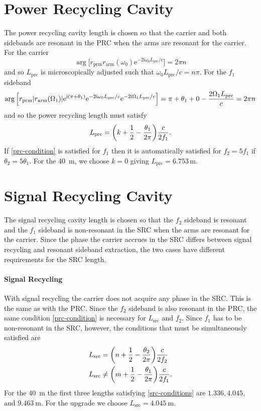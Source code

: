\documentclass[12pt]{article}
\newcommand{\mr}[1]{\mathrm{#1}}
\newcommand{\e}{\mr{e}}
\renewcommand{\i}{\mr{i}}
\newcommand{\abs}[1]{\left|#1\right|}
\let\originalleft\left
\let\originalright\right
\renewcommand{\left}{\mathopen{}\mathclose\bgroup\originalleft}
\renewcommand{\right}{\aftergroup\egroup\originalright}
\begin{document}
\section{Power Recycling Cavity}

The power recycling cavity length is chosen so that the carrier and both sidebands are resonant in the PRC when the arms are resonant for the carrier. For the carrier
\begin{equation}
\arg \Big[ r_\mr{prm} r_\mr{arm}(\omega_0) \e^{-2\i\omega_0 L_\mr{prc}/c} \Big] = 2\pi n
\end{equation}
and so $L_\mr{prc}$ is microscopically adjusted such that $\omega_0 L_\mr{prc} / c = n\pi$. For the $f_1$ sideband
\begin{equation}
\arg \Big[r_\mr{prm} \abs{r_\mr{arm}(\Omega_1)}\e^{\i(\pi + \theta_1)} \e^{-2\i\omega_0 L_\mr{prc}/c}
\e^{-2\i\Omega_1 L_\mr{prc}/c} \Big]
= \pi + \theta_1 + 0 - \frac{2\Omega_1 L_\mr{prc}}{c}
= 2\pi n
\end{equation}
and so the power recycling length must satisfy
\begin{equation}
L_\mr{prc} = \left(k + \frac{1}{2} - \frac{\theta_1}{2\pi} \right) \frac{c}{2f_1}.
\label{prc-condition}
\end{equation}
If \eqref{prc-condition} is satisfied for $f_1$ then it is automatically satisfied for $f_2 = 5f_1$ if $\theta_2 = 5\theta_1$. For the 40~m, we choose $k=0$ giving $L_\mr{prc} = 6.753\,\mr{m}$.


\section{Signal Recycling Cavity}

The signal recycling cavity length is chosen so that the $f_2$ sideband is resonant and the $f_1$ sideband is non-resonant in the SRC when the arms are resonant for the carrier. Since the phase the carrier accrues in the SRC differs between signal recycling and resonant sideband extraction, the two cases have different requirements for the SRC length.

\paragraph{Signal Recycling} With signal recycling the carrier does not acquire any phase in the SRC. This is the same as with the PRC. Since the $f_2$ sideband is also resonant in the PRC, the same condition \eqref{prc-condition} is necessary for $L_\mr{src}$ and $f_2$. Since $f_1$ has to be non-resonant in the SRC, however, the conditions that must be simultaneously satisfied are
\begin{subequations}
\label{src-conditions}
\begin{align}
L_\mr{src} &= \left( n + \frac{1}{2} - \frac{\theta_2}{2\pi}\right) \frac{c}{2f_2}\\
L_\mr{src} &\neq \left( m + \frac{1}{2} - \frac{\theta_1}{2\pi}\right) \frac{c}{2f_1}.
\end{align}
\end{subequations}
For the 40~m the first three lengths satisfying \eqref{src-conditions} are $1.336, 4.045,$ and $9.463~\mr{m}$. For the upgrade we choose $L_\mr{src} = 4.045~\mr{m}$.
\end{document}
